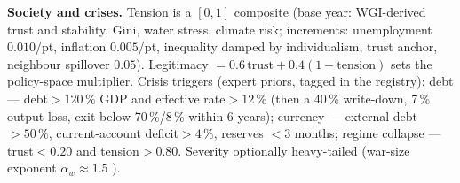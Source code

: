 \documentclass[a4paper,fleqn]{cas-sc}
\begin{document}
\textbf{Society and crises.} Tension is a $[0,1]$ composite (base year: WGI-derived trust and
stability, Gini, water stress, climate risk; increments: unemployment $0.010$/pt, inflation
$0.005$/pt, inequality damped by individualism, trust anchor, neighbour spillover $0.05$).
Legitimacy $=0.6\,\text{trust}+0.4(1-\text{tension})$ sets the policy-space multiplier. Crisis
triggers (expert priors, tagged in the registry): debt --- debt${}>120\,\%$ GDP and effective
rate${}>12\,\%$ (then a 40\,\% write-down, 7\,\% output loss, exit below 70\,\%/8\,\% within 6
years); currency --- external debt${}>50\,\%$, current-account deficit${}>4\,\%$, reserves
${}<3$ months; regime collapse --- trust${}<0.20$ and tension${}>0.80$. Severity optionally
heavy-tailed (war-size exponent $\alpha_w\approx1.5$ \cite{richardson1948,clauset2009}).
\end{document}
